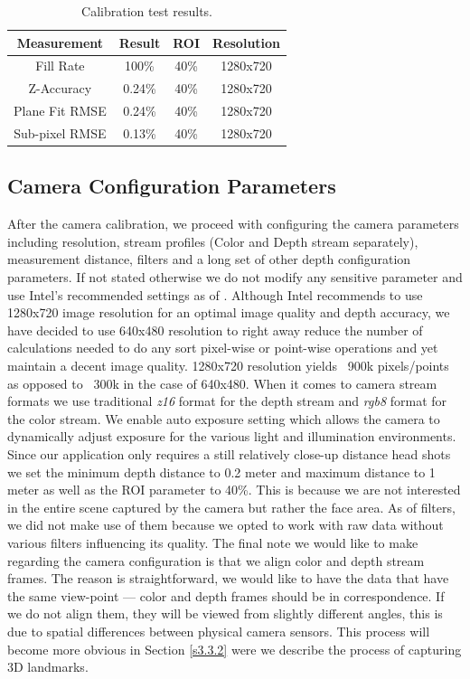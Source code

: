 \begin{table}[h]
  \centering
  \begin{tabular}{c|c|c|c}
    Measurement  & Result & ROI & Resolution\\
    \hline
    Fill Rate   & 100\%  &40\% & 1280x720 \\ \hline
    Z-Accuracy   & 0.24\% &40\% & 1280x720 \\ \hline
    Plane Fit RMSE   & 0.24\% & 40\% & 1280x720 \\ \hline
    Sub-pixel RMSE   & 0.13\% & 40\% & 1280x720 \\ 
    \hline
  \end{tabular}
  \caption{Calibration test results.}
  \label{t3.1}
\end{table}

\subsection{Camera Configuration Parameters}
After the camera calibration, we proceed with configuring the camera parameters including resolution, stream profiles (Color and Depth stream separately), measurement distance, filters and a long set of other depth configuration parameters. If not stated otherwise we do not modify any sensitive parameter and use Intel's recommended settings as of \cite{bestcal}. Although Intel recommends to use 1280x720 image resolution for an optimal image quality and depth accuracy, we have decided to use 640x480 resolution to right away reduce the number of calculations needed to do any sort pixel-wise or point-wise operations and yet maintain a decent image quality. 1280x720 resolution yields ~900k pixels/points as opposed to ~300k in the case of 640x480. When it comes to camera stream formats we use traditional \textit{z16} format for the depth stream and \textit{rgb8} format for the color stream. We enable auto exposure setting which allows the camera to dynamically adjust exposure for the various light and illumination environments. Since our application only requires a still relatively close-up distance head shots we set the minimum depth distance to 0.2 meter and maximum distance to 1 meter as well as the ROI parameter to 40\%. This is because we are not interested in the entire scene captured by the camera but rather the face area.  As of filters, we did not make use of them because we opted to work with raw data without various filters influencing its quality.  The final note we would like to make regarding the camera configuration is that we align color and depth stream frames. The reason is straightforward, we would like to have the data that have the same view-point — color and depth frames should be in correspondence. If we do not align them, they will be viewed from slightly different angles, this is due to spatial differences between physical camera sensors. This process will become more obvious in Section \ref{s3.3.2} were we describe the process of capturing 3D landmarks. 

